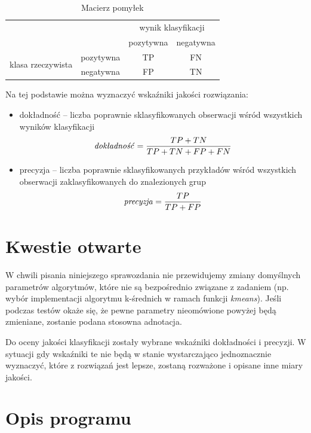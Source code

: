 \documentclass[11pt,a4paper,twoside]{article}
\begin{document}
\begin{table}[ht]
\centering
\caption{Macierz pomyłek}
\label{confusionMatrix}
\begin{tabular}{|*{4}{c|}}
\cline{3-4}
  \multicolumn{2}{c}{} & \multicolumn{2}{|c|}{wynik klasyfikacji}\\\cline{3-4}
  \multicolumn{2}{c|}{} & pozytywna & negatywna\\\hline
  \multirow{2}{*}{klasa rzeczywista}& pozytywna & TP & FN\\\cline{2-4}
  & negatywna & FP & TN\\\hline
\end{tabular}
\end{table}

Na tej podstawie można wyznaczyć wskaźniki jakości rozwiązania:
\begin{itemize}[label={--}]
\item dokładność -- liczba poprawnie sklasyfikowanych obserwacji wśród wszystkich wyników klasyfikacji $$\text{\emph{dokładność}} = \frac{TP+TN}{TP+TN+FP+FN}$$
\item precyzja -- liczba poprawnie sklasyfikowanych przykładów wśród wszystkich obserwacji zaklasyfikowanych do znalezionych grup $$\text{\emph{precyzja}} = \frac{TP}{TP+FP}$$
\end{itemize}


\section{Kwestie otwarte}
W chwili pisania niniejszego sprawozdania nie przewidujemy zmiany domyślnych parametrów algorytmów, które nie są bezpośrednio związane z zadaniem (np. wybór implementacji algorytmu k-średnich w ramach funkcji \textit{kmeans}). Jeśli podczas testów okaże się, że pewne parametry nieomówione powyżej będą zmieniane, zostanie podana stosowna adnotacja.

Do oceny jakości klasyfikacji zostały wybrane wskaźniki dokładności i precyzji. W sytuacji gdy wskaźniki te nie będą w stanie wystarczająco jednoznacznie wyznaczyć, które z rozwiązań jest lepsze, zostaną rozważone i opisane inne miary jakości.

\section{Opis programu}
\end{document}
